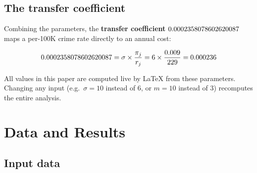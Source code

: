 \documentclass[a4paper,11pt]{article}
\def\SevMult{6}          %
\def\JewPure{0.009}      %
\def\JewCrime{229}       %
\edef\kappa{\fpeval{\SevMult * \JewPure / \JewCrime}}
\begin{document}
\subsection{The transfer coefficient}

Combining the parameters, the \textbf{transfer coefficient} $\kappa$ maps a per-100K crime rate directly to an annual cost:

\[
  \kappa = \sigma \times \frac{\pi_j}{r_j} = \SevMult \times \frac{\JewPure}{\JewCrime} = \fpeval{round(\kappa, 6)}
\]

\noindent All values in this paper are computed live by \LaTeX{} from these parameters. Changing any input (e.g.\ $\sigma = 10$ instead of 6, or $m = 10$ instead of 3) recomputes the entire analysis.

\section{Data and Results}

\subsection{Input data}
\end{document}
